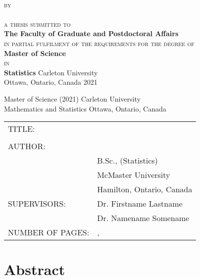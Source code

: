 \begin{titlepage}
	\thispagestyle{empty}
	\centering
	\vspace*{\fill}
	{\LARGE \textbf{\expandafter{\thesistitleI}}}\\[2mm]
	{\LARGE \textbf{\expandafter{\thesistitleII}}}
	\vfill
	{\scshape by}\\
	{\large \expandafter{\myname}}\\
	\vfill	
	{\scshape a thesis submitted to}\\
	\textbf{The Faculty of Graduate and Postdoctoral Affairs}\\
	{\scshape in partial fulfilment of the requirements for the degree of}\\
	\textbf{Master of Science}\\
	{\scshape in}\\
	\textbf{Statistics}
	\vfill
	{\large Carleton University}\\
	{\large Ottawa, Ontario, Canada}
	\vfill
	{\large \textcopyright{} 2021}\\
	{\large \expandafter{\myname}}
\end{titlepage}

\clearpage

	\setcounter{page}{2}
	\noindent
	Master of Science (2021) \hfill Carleton University\\
	Mathematics and Statistics \hfill Ottawa, Ontario, Canada
	
	\vspace*{\fill}
	
	\begin{tabular}{l l}
	TITLE:				&	\thesistitleI\\
						&	\thesistitleII\\[5mm]
	AUTHOR:				&	\myname\\
						&	B.Sc., (Statistics)\\
						&	McMaster University\\
						&	Hamilton, Ontario, Canada\\[5mm]
	SUPERVISORS:		&	Dr. Firstname Lastname\\
						&	Dr. Namename Somename\\[5mm]
	NUMBER OF PAGES:	&	\pageref*{endfrontmatter}, \pageref*{endmainmatter}
	\end{tabular}

	\vfill

\clearpage


\chapter*{Abstract}


